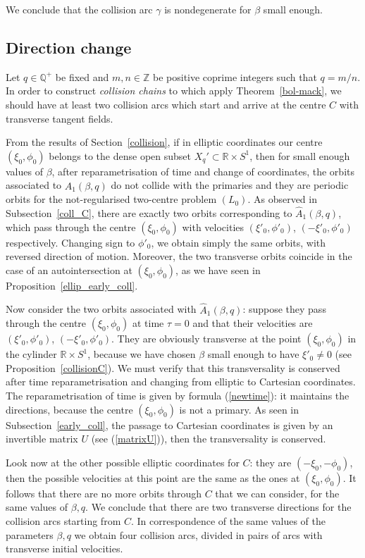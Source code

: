 \documentclass[a4paper]{article}
\begin{document}
We conclude that the collision arc $\gamma$ is nondegenerate for $\beta$  
small enough. 

\subsection{Direction change}
\label{dir_change}
Let $q \in {\mathbb{Q}}^+$ be fixed and $m,n \in {\mathbb{Z}}$ be positive coprime
integers such that $q=m/n$.  In order to construct \emph{collision
  chains} to which apply Theorem~\ref{bol-mack}, we should have at
least two collision arcs which start and arrive at the centre $C$ with
transverse tangent fields.

From the results of Section~\ref{collision}, if in elliptic
coordinates our centre $(\xi_0,\phi_0)$ belongs to the dense open
subset $X_q' \subset {\mathbb{R}} \times S^1$, then for small enough values of
$\beta$, after reparametrisation of time and change of coordinates,
the orbits associated to $\hat{A}_1(\beta,q)$ do not collide with the
primaries and they are periodic orbits for the not-regularised
two-centre problem $(L_0)$.  As observed in Subsection~\ref{coll_C},
there are exactly two orbits corresponding to $\hat{A}_1(\beta,q)$,
which pass through the centre $(\xi_0,\phi_0)$ with velocities
$(\xi'_0,\phi'_0)$, $(-\xi'_0,\phi'_0)$ respectively.  Changing sign
to $\phi'_0$, we obtain simply the same orbits, with reversed
direction of motion.  Moreover, the two transverse orbits coincide in
the case of an autointersection at $(\xi_0,\phi_0)$, as we have seen
in Proposition~\ref{ellip_early_coll}.

Now consider the two orbits associated with $\hat{A}_1(\beta,q)$:
suppose they pass through the centre $(\xi_0,\phi_0)$ at time $\tau=0$
and that their velocities are $(\xi'_0,\phi'_0)$,
$(-\xi'_0,\phi'_0)$. They are obviously transverse at the point
$(\xi_0,\phi_0)$ in the cylinder ${\mathbb{R}} \times S^1$, because we have
chosen $\beta$ small enough to have $\xi'_0\neq 0$ (see
Proposition~\ref{collisionC}).  We must verify that this
transversality is conserved after time reparametrisation and changing
from elliptic to Cartesian coordinates.  The reparametrisation of time
is given by formula (\ref{newtime}): it maintains the directions,
because the centre $(\xi_0,\phi_0)$ is not a primary.  As seen in
Subsection~\ref{early_coll}, the passage to Cartesian coordinates is
given by an invertible matrix $U$ (see (\ref{matrixU})), then the
transversality is conserved.

Look now at the other possible elliptic coordinates for $C$: they are
$(-\xi_0,-\phi_0)$, then the possible velocities at this point are the
same as the ones at $(\xi_0,\phi_0)$. It follows that there are no
more orbits through $C$ that we can consider, for the same values of
$\beta, q$.  We conclude that there are two transverse directions for
the collision arcs starting from $C$. In correspondence of the same
values of the parameters $\beta, q$ we obtain four collision arcs,
divided in pairs of arcs with transverse initial velocities.
\end{document}
